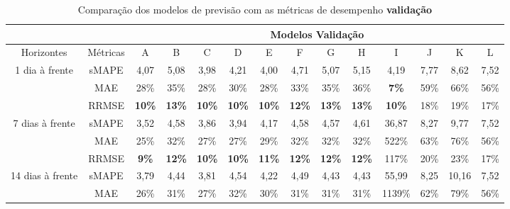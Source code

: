 \begin{landscape}
\begin{table}[H]
	\centering
	\caption{Comparação dos modelos de previsão com as métricas de desempenho \textbf{validação}}\label{tb:apd-vld}
	\begin{tabular}{@{}cccccccccccccc@{}}
		\toprule
		&          & \multicolumn{12}{c}{Modelos Validação}                                                                                                                              \\ \midrule
		Horizontes                        & Métricas & A             & B             & C             & D             & E             & F             & G             & H             & I             & J    & K     & L    \\ \midrule
		\multirow{3}{*}{1 dia à frente}   & sMAPE    & 4,07          & 5,08          & 3,98          & 4,21          & 4,00          & 4,71          & 5,07          & 5,15          & 4,19          & 7,77 & 8,62  & 7,52 \\
		& MAE      & 28\%          & 35\%          & 28\%          & 30\%          & 28\%          & 33\%          & 35\%          & 36\%          & \textbf{7\%}  & 59\% & 66\%  & 56\% \\
		& RRMSE    & \textbf{10\%} & \textbf{13\%} & \textbf{10\%} & \textbf{10\%} & \textbf{10\%} & \textbf{12\%} & \textbf{13\%} & \textbf{13\%} & \textbf{10\%} & 18\% & 19\%  & 17\% \\ \midrule
		\multirow{3}{*}{7 dias à frente}  & sMAPE    & 3,52          & 4,58          & 3,86          & 3,94          & 4,17          & 4,58          & 4,57          & 4,61          & 36,87         & 8,27 & 9,77  & 7,52 \\
		& MAE      & 25\%          & 32\%          & 27\%          & 27\%          & 29\%          & 32\%          & 32\%          & 32\%          & 522\%         & 63\% & 76\%  & 56\% \\
		& RRMSE    & \textbf{9\%}  & \textbf{12\%} & \textbf{10\%} & \textbf{10\%} & \textbf{11\%} & \textbf{12\%} & \textbf{12\%} & \textbf{12\%} & 117\%         & 20\% & 23\%  & 17\% \\ \midrule
		\multirow{3}{*}{14 dias à frente} & sMAPE    & 3,79          & 4,44          & 3,81          & 4,54          & 4,22          & 4,49          & 4,43          & 4,43          & 55,99         & 8,25 & 10,16 & 7,52 \\
		& MAE      & 26\%          & 31\%          & 27\%          & 32\%          & 30\%          & 31\%          & 31\%          & 31\%          & 1139\%        & 62\% & 79\%  & 56\% \\

\end{tabular}
\end{table}
\end{landscape}
